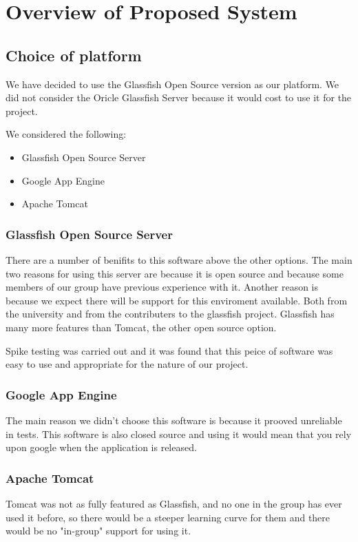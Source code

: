 \documentclass{article}
\begin{document}
\section{Overview of Proposed System}

\subsection{Choice of platform}
We have decided to use the Glassfish Open Source version as our platform. 
We did not consider the Oricle Glassfish Server because it would cost to
use it for the project.

We considered the following:
\begin{itemize}
	\item{Glassfish Open Source Server}
	\item{Google App Engine}
	\item{Apache Tomcat}
\end{itemize}

\subsubsection{Glassfish Open Source Server}
There are a number of benifits to this software above the other options.
The main two reasons for using this server are because it is open source
and because some members of our group have previous experience with it.
Another reason is because we expect there will be support for this
enviroment available. Both from the university and from the contributers
to the glassfish project. Glassfish has many more features than Tomcat,
the other open source option.

Spike testing was carried out and it was found that this peice of software
was easy to use and appropriate for the nature of our project.

\subsubsection{Google App Engine}
The main reason we didn't choose this software is because it prooved
unreliable in tests. This software is also closed source and using it
would mean that you rely upon google when the application is released.

\subsubsection{Apache Tomcat}
Tomcat was not as fully featured as Glassfish, and no one in the group 
has ever used it before, so there would be a steeper learning curve for
them and there would be no "in-group" support for using it.
\end{document}
